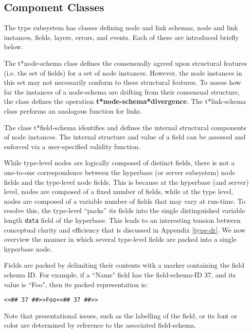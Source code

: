 \subsection{Component Classes}

The type subsystem has classes defining node and link schemas, node and
link instances, fields, layers, errors, and events.  Each of these are introduced
briefly below.

The {\sf t*node-schema} class defines the consensually 
agreed upon structural features (i.e. the set of fields)
for a set of node instances.  However, the node instances in
this set may not necessarily conform to these structural 
features.   To assess how far the instances of a node-schema
are drifting from their consensual structure, the class defines
the operation  {\bf t*node-schema*divergence}. The {\sf t*link-schema}
class performs an analogous function for links.

The class {\sf t*field-schema} identifies and defines the internal structural
components of node instances.  The internal structure and value of a field can be
assessed and enforced via a user-specified validity function.

While type-level nodes are logically composed of distinct fields,
there is not a one-to-one correspondence between the hyperbase (or
server subsystem) node fields and the type-level node fields.  This is
because at the hyperbase (and server) level, nodes are composed of a
fixed number of fields, while at the type level, nodes are composed of
a variable number of fields that may vary at run-time.  To resolve
this, the type-level ``packs'' its fields into the single
distinguished variable length {\tt data} field of the hyperbase.  This
leads to an interesting tension between conceptual clarity and
efficiency that is discussed in Appendix \ref{type-dr}.  We now
overview the manner in which several type-level fields are packed into
a single hyperbase node.

Fields are packed by delimiting their contents with a marker
containing the field schema ID. For example, if a ``Name" field has the
field-schema-ID 37, and its value is ``Foo", then its packed
representation is:

\small\begin{verbatim}
<<## 37 ##>>Foo<<## 37 ##>>
\end{verbatim}\normalsize

Note that presentational issues, such as the labelling
of the field, or its font or color are determined by
reference to the associated field-schema.

